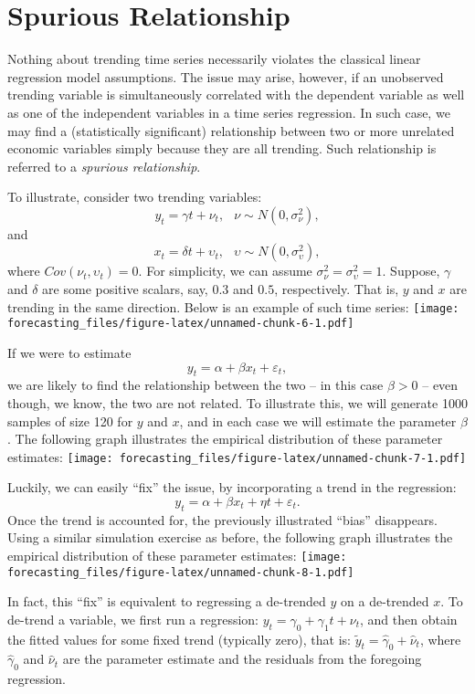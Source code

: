 \documentclass[
  oneside]{book}
\begin{document}
\hypertarget{spurious-relationship}{%
\section{Spurious Relationship}\label{spurious-relationship}}

Nothing about trending time series necessarily violates the classical linear regression model assumptions. The issue may arise, however, if an unobserved trending variable is simultaneously correlated with the dependent variable as well as one of the independent variables in a time series regression. In such case, we may find a (statistically significant) relationship between two or more unrelated economic variables simply because they are all trending. Such relationship is referred to a \emph{spurious relationship}.

To illustrate, consider two trending variables: \[y_t = \gamma t + \nu_t,\;~~\nu\sim N(0,\sigma_{\nu}^2),\] and \[x_t = \delta t + \upsilon_t,\;~~\upsilon\sim N(0,\sigma_{\upsilon}^2),\] where \(Cov(\nu_t,\upsilon_t) = 0\). For simplicity, we can assume \(\sigma_{\nu}^2=\sigma_{\upsilon}^2=1\). Suppose, \(\gamma\) and \(\delta\) are some positive scalars, say, \(0.3\) and \(0.5\), respectively. That is, \(y\) and \(x\) are trending in the same direction. Below is an example of such time series:
\texttt{[image: forecasting\_files/figure-latex/unnamed-chunk-6-1.pdf]}

If we were to estimate \[y_t = \alpha+\beta x_t + \varepsilon_t,\] we are likely to find the relationship between the two -- in this case \(\beta>0\) -- even though, we know, the two are not related. To illustrate this, we will generate 1000 samples of size 120 for \(y\) and \(x\), and in each case we will estimate the parameter \(\beta\). The following graph illustrates the empirical distribution of these parameter estimates:
\texttt{[image: forecasting\_files/figure-latex/unnamed-chunk-7-1.pdf]}

Luckily, we can easily ``fix'' the issue, by incorporating a trend in the regression: \[y_t = \alpha+\beta x_t + \eta t + \varepsilon_t.\] Once the trend is accounted for, the previously illustrated ``bias'' disappears. Using a similar simulation exercise as before, the following graph illustrates the empirical distribution of these parameter estimates:
\texttt{[image: forecasting\_files/figure-latex/unnamed-chunk-8-1.pdf]}

In fact, this ``fix'' is equivalent to regressing a de-trended \(y\) on a de-trended \(x\). To de-trend a variable, we first run a regression: \(y_t = \gamma_0 + \gamma_1 t + \nu_t\), and then obtain the fitted values for some fixed trend (typically zero), that is: \(\tilde{y}_t = \hat{\gamma}_0+\hat{\nu}_t\), where \(\hat{\gamma}_0\) and \(\hat{\nu}_t\) are the parameter estimate and the residuals from the foregoing regression.
\end{document}
